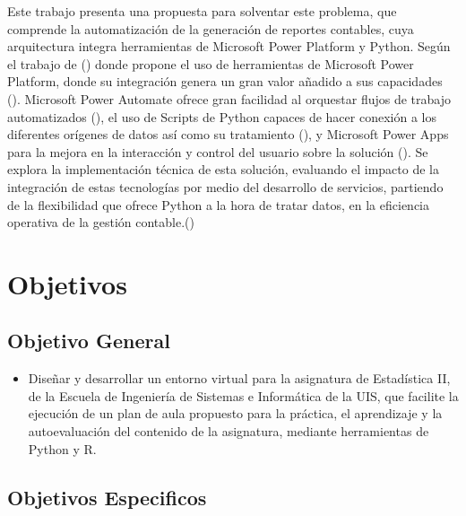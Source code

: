 \documentclass[letter,oneside,12pt,spanish]{report}
\begin{document}

Este trabajo presenta una propuesta para solventar este problema, que comprende la automatización de la generación de reportes contables, cuya arquitectura integra herramientas de Microsoft Power Platform y Python. Según el trabajo de (\cite{narayn2023building}) donde propone el uso de herramientas de Microsoft Power Platform, donde su integración genera un gran valor añadido a sus capacidades (\cite{narayn2023building}). Microsoft Power Automate ofrece gran facilidad al orquestar flujos de trabajo automatizados (\cite{hvartiainen2024leanmanagement}), el uso de Scripts de Python capaces de hacer conexión a los diferentes orígenes de datos así como su tratamiento (\cite{rattenbury2017principles}), y Microsoft Power Apps para la mejora en la interacción y control del usuario sobre la solución (\cite{psimon2022lowcode}). Se explora la implementación técnica de esta solución, evaluando el impacto de la integración de estas tecnologías por medio del desarrollo de servicios, partiendo de la flexibilidad que ofrece Python a la hora de tratar datos, en la eficiencia operativa de la gestión contable.(\cite{RCore2020})


\newpage


\chapter{Objetivos}

\section{Objetivo General}

\begin{itemize}
    \item Diseñar y desarrollar un entorno virtual para la asignatura de Estadística II, de la Escuela de Ingeniería de Sistemas e Informática de la UIS, que facilite la ejecución de un plan de aula propuesto para la práctica, el aprendizaje y la autoevaluación del contenido de la asignatura, mediante herramientas de Python y R.
\end{itemize}

\section{Objetivos Especificos}
\end{document}
